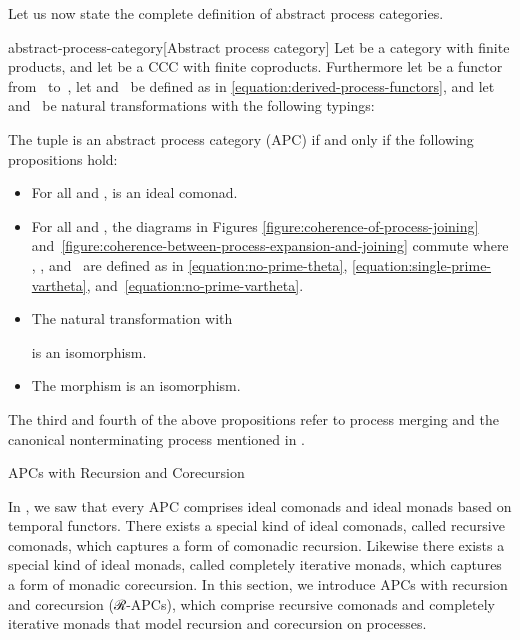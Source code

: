 \documentclass[copyright,creativecommons]{eptcs}
\begin{document}

Let us now state the complete definition of abstract process categories.

\begin{extdefinition}{abstract-process-category}[Abstract process category]
Let  be a category with finite products, and let  be a CCC with finite
coproducts. Furthermore let  be a functor from~ to~, let 
and~ be defined as in \eqref{equation:derived-process-functors}, and let 
and~ be natural transformations with the following typings:

The tuple  is an abstract process category (APC) if and only
if the following propositions hold:
\begin{itemize}

\item

For all  and , 
is an ideal comonad.

\item

For all  and , the diagrams in Figures
\ref{figure:coherence-of-process-joining}
and~\ref{figure:coherence-between-process-expansion-and-joining} commute where
, , and~ are defined as in \eqref{equation:no-prime-theta},
\eqref{equation:single-prime-vartheta}, and~\eqref{equation:no-prime-vartheta}.

\item

The natural transformation  with

is an isomorphism.

\item

The morphism  is an isomorphism.

\end{itemize}
\end{extdefinition}

The third and fourth of the above propositions refer to process merging and the
canonical nonterminating process mentioned in
.

           {APCs with Recursion and Corecursion}

In , we saw that every APC
comprises ideal comonads and ideal monads based on temporal functors. There
exists a special kind of ideal comonads, called recursive comonads, which
captures a form of comonadic recursion. Likewise there exists a special kind of
ideal monads, called completely iterative monads, which captures a form of
monadic corecursion. In this section, we introduce APCs with recursion and
corecursion (ℛ-APCs), which comprise recursive comonads and completely iterative
monads that model recursion and corecursion on processes.
\end{document}
